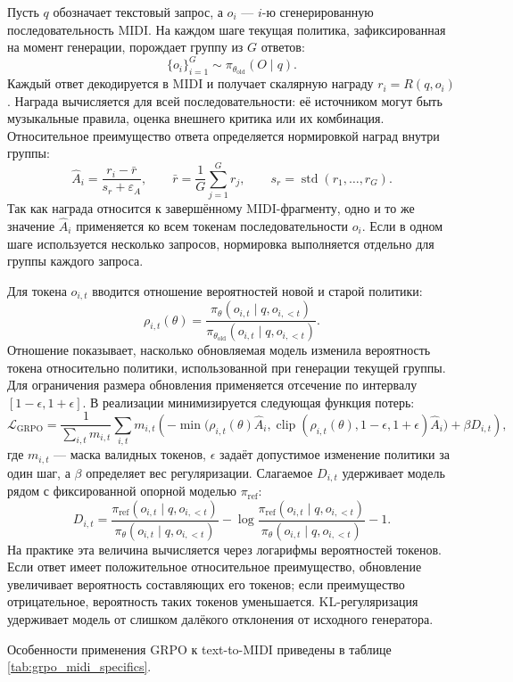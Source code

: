 \documentclass[a4paper,12pt]{extarticle}
\begin{document}
Пусть $q$ обозначает текстовый запрос, а $o_i$ --- $i$-ю
сгенерированную последовательность MIDI. На каждом шаге текущая политика,
зафиксированная на момент генерации, порождает группу из $G$ ответов:
\[
\{o_i\}_{i=1}^G \sim \pi_{\theta_{\mathrm{old}}}(O \mid q).
\]
Каждый ответ декодируется в MIDI и получает скалярную награду
$r_i = R(q,o_i)$. Награда вычисляется для всей последовательности:
её источником могут быть музыкальные правила, оценка внешнего критика
или их комбинация. Относительное преимущество ответа определяется
нормировкой наград внутри группы:
\[
\hat{A}_{i} =
\frac{r_i - \bar r}
{s_r+\varepsilon_A},
\qquad
\bar r = \frac{1}{G}\sum_{j=1}^{G} r_j,
\qquad
s_r = \operatorname{std}(r_1,\ldots,r_G).
\]
Так как награда относится к завершённому MIDI-фрагменту, одно и то же
значение $\hat{A}_{i}$ применяется ко всем токенам последовательности
$o_i$. Если в одном шаге используется несколько запросов, нормировка
выполняется отдельно для группы каждого запроса.

Для токена $o_{i,t}$ вводится отношение вероятностей новой и старой
политики:
\[
\rho_{i,t}(\theta)=
\frac{\pi_\theta(o_{i,t}\mid q,o_{i,<t})}
{\pi_{\theta_{\mathrm{old}}}(o_{i,t}\mid q,o_{i,<t})}.
\]
Отношение показывает, насколько обновляемая модель изменила
вероятность токена относительно политики, использованной при генерации
текущей группы. Для ограничения размера обновления применяется отсечение
по интервалу $[1-\epsilon,1+\epsilon]$. В реализации минимизируется
следующая функция потерь:
\[
\mathcal{L}_{\mathrm{GRPO}} =
\frac{1}{\sum_{i,t} m_{i,t}}
\sum_{i,t} m_{i,t}
\left(
-\min\big(
\rho_{i,t}(\theta)\hat{A}_{i},
\operatorname{clip}(\rho_{i,t}(\theta),1-\epsilon,1+\epsilon)\hat{A}_{i}
\big)
+\beta D_{i,t}
\right),
\]
где $m_{i,t}$ --- маска валидных токенов, $\epsilon$ задаёт допустимое
изменение политики за один шаг, а $\beta$ определяет вес регуляризации.
Слагаемое $D_{i,t}$ удерживает модель рядом с фиксированной опорной
моделью $\pi_{\mathrm{ref}}$:
\[
D_{i,t} =
\frac{\pi_{\mathrm{ref}}(o_{i,t}\mid q,o_{i,<t})}
{\pi_\theta(o_{i,t}\mid q,o_{i,<t})}
-
\log
\frac{\pi_{\mathrm{ref}}(o_{i,t}\mid q,o_{i,<t})}
{\pi_\theta(o_{i,t}\mid q,o_{i,<t})}
-1.
\]
На практике эта величина вычисляется через логарифмы вероятностей токенов.
Если ответ имеет положительное относительное преимущество, обновление
увеличивает вероятность составляющих его токенов; если преимущество
отрицательное, вероятность таких токенов уменьшается. KL-регуляризация
удерживает модель от слишком далёкого отклонения от
исходного генератора.

Особенности применения GRPO к text-to-MIDI приведены в
таблице \ref{tab:grpo_midi_specifics}.
\end{document}
